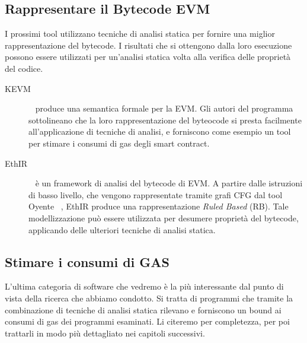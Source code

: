 \subsection{Rappresentare il Bytecode EVM}

I prossimi tool utilizzano tecniche di analisi statica per fornire una miglior rappresentazione del bytecode. I risultati che si ottengono dalla loro esecuzione possono essere utilizzati per un'analisi statica volta alla verifica delle proprietà del codice.\newline

\begin{description}

    \item[KEVM] ~\cite{hildenbrandt2017kevm} produce una semantica formale per la EVM. Gli autori del programma sottolineano che la loro rappresentazione del byteocode si presta facilmente all'applicazione di tecniche di analisi, e forniscono come esempio un tool per stimare i consumi di gas degli smart contract.\newline

    \item[EthIR] ~\cite{albert2018ethir} è un framework di analisi del bytecode di EVM. A partire dalle istruzioni di basso livello, che vengono rappresentate tramite grafi CFG dal tool Oyente ~\cite{melonproject/oyente}, EthIR produce una rappresentazione \textit{Ruled Based} (RB). Tale modellizzazione può essere utilizzata per desumere proprietà del bytecode, applicando delle ulteriori tecniche di analisi statica.\newline
    
\end{description}

\subsection{Stimare i consumi di GAS}

L'ultima categoria di software che vedremo è la più interessante dal punto di vista della ricerca che abbiamo condotto. Si tratta di programmi che tramite la combinazione di tecniche di analisi statica rilevano e forniscono un bound ai consumi di gas dei programmi esaminati.\newline
\indent Li citeremo per completezza, per poi trattarli in modo più dettagliato nei capitoli successivi.\newline


